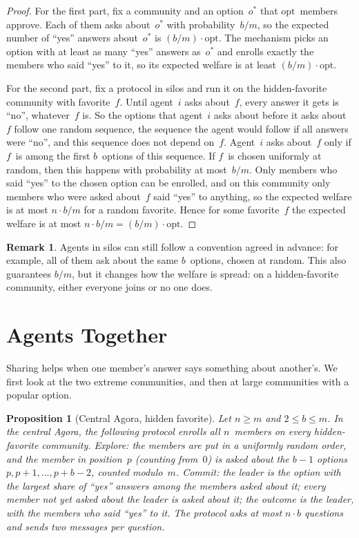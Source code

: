 \documentclass[11pt]{article}
\newtheorem{proposition}{Proposition}
\theoremstyle{definition}
\newtheorem{remark}{Remark}
\newcommand{\opt}{\mathrm{opt}}
\begin{document}
\begin{proof}
For the first part, fix a community and an option~$o^\ast$ that $\opt$~members approve.
Each of them asks about~$o^\ast$ with probability~$b/m$, so the expected number of ``yes'' answers about~$o^\ast$ is $(b/m)\cdot\opt$.
The mechanism picks an option with at least as many ``yes'' answers as~$o^\ast$ and enrolls exactly the members who said ``yes'' to it, so its expected welfare is at least $(b/m)\cdot\opt$.

For the second part, fix a protocol in silos and run it on the hidden-favorite community with favorite~$f$.
Until agent~$i$ asks about~$f$, every answer it gets is ``no'', whatever~$f$ is.
So the options that agent~$i$ asks about before it asks about~$f$ follow one random sequence, the sequence the agent would follow if all answers were ``no'', and this sequence does not depend on~$f$.
Agent~$i$ asks about~$f$ only if $f$~is among the first $b$~options of this sequence.
If $f$~is chosen uniformly at random, then this happens with probability at most~$b/m$.
Only members who said ``yes'' to the chosen option can be enrolled, and on this community only members who were asked about~$f$ said ``yes'' to anything, so the expected welfare is at most $n \cdot b/m$ for a random favorite.
Hence for some favorite~$f$ the expected welfare is at most $n \cdot b/m = (b/m)\cdot\opt$.
\end{proof}

\begin{remark}
Agents in silos can still follow a convention agreed in advance: for example, all of them ask about the same $b$~options, chosen at random.
This also guarantees $b/m$, but it changes how the welfare is spread: on a hidden-favorite community, either everyone joins or no one does.
\end{remark}

\section{Agents Together}

Sharing helps when one member's answer says something about another's.
We first look at the two extreme communities, and then at large communities with a popular option.

\begin{proposition}[Central Agora, hidden favorite]\label{prop:central}
Let $n \ge m$ and $2 \le b \le m$.
In the central Agora, the following protocol enrolls all $n$~members on every hidden-favorite community.
\emph{Explore:} the members are put in a uniformly random order, and the member in position~$p$ (counting from~$0$) is asked about the $b-1$ options $p, p+1, \dots, p+b-2$, counted modulo~$m$.
\emph{Commit:} the leader is the option with the largest share of ``yes'' answers among the members asked about it; every member not yet asked about the leader is asked about it; the outcome is the leader, with the members who said ``yes'' to it.
The protocol asks at most $n \cdot b$ questions and sends two messages per question.
\end{proposition}
\end{document}
